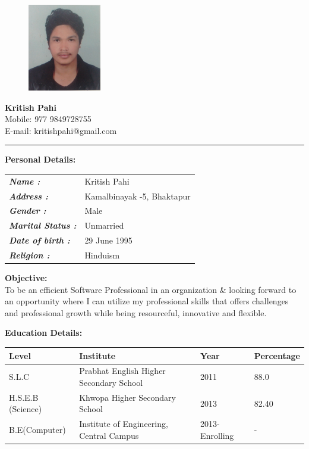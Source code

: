 \documentclass[paper = a4paper, 12pt]{article}
\begin{document}
\pagestyle{empty}

\begin{figure}
	\includegraphics[height=1.5in]{k}
\end{figure}


{\Huge
	\textbf{Kritish Pahi} \\}
	\small{Mobile: 977 9849728755}\\
	\small{E-mail: kritishpahi@gmail.com}\\

	
\begin{figure}\end{figure}
 \rule[2pt]{\textwidth}{1pt}


{ \Large \textbf{Personal Details:}\\
}
\begin{tabular}{l l}
	 \textbf{\emph{Name :}} & Kritish Pahi \\
	 \textbf{\emph{Address :}}&  Kamalbinayak -5, Bhaktapur \\
	 \textbf{\emph{Gender :}} & Male \\
	 \textbf{\emph{Marital Status :}} & Unmarried \\ 
	 \textbf{\emph{Date of birth :}} & 29 June 1995 \\ 
	 \textbf{\emph{Religion :}} & Hinduism \\ 
\end{tabular}
\vspace{8mm}

{\Large \textbf{Objective:} \\
}
To be an efficient Software Professional in an organization \& looking forward
to an opportunity where I can utilize my professional skills that offers 
challenges and professional growth while being resourceful, innovative 
and flexible.

\vspace{8mm}
{\Large \textbf{ Education Details: } \\
}
\begin{tabular}{l l l l}
	\textbf{Level} & \textbf{Institute} &\textbf{Year} & \textbf{Percentage} \\ \hline
	S.L.C & Prabhat English Higher Secondary School & 2011 & 88.0 \\ \hline
	H.S.E.B (Science) & Khwopa Higher Secondary School & 2013 & 82.40 \\ \hline
	B.E(Computer) & Institute of Engineering, Central Campus & 2013-Enrolling & - \\ \hline
\end{tabular}
\end{document}
